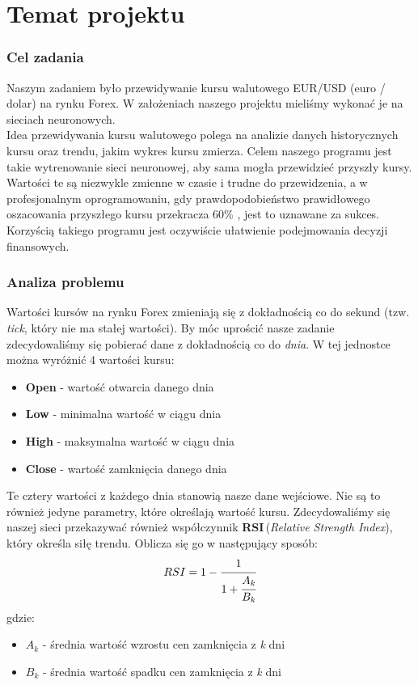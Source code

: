 \documentclass[a4paper]{article}
\begin{document}
	\part{Temat projektu}
		\section{Cel zadania}
		Naszym zadaniem było przewidywanie kursu walutowego EUR/USD (euro / dolar) na rynku Forex. W założeniach naszego projektu mieliśmy wykonać je na sieciach neuronowych.\\
		Idea przewidywania kursu walutowego polega na analizie danych historycznych kursu oraz trendu, jakim wykres kursu zmierza. Celem naszego programu jest takie wytrenowanie sieci neuronowej, aby sama mogła przewidzieć przyszły kursy. Wartości te są niezwykle zmienne w czasie i trudne do przewidzenia, a w profesjonalnym oprogramowaniu, gdy  prawdopodobieństwo prawidłowego oszacowania przyszłego kursu przekracza 60\% , jest to uznawane za sukces. Korzyścią takiego programu jest oczywiście ułatwienie podejmowania decyzji finansowych.
		\section{Analiza problemu}\label{sec:analiza}
			Wartości kursów na rynku Forex zmieniają się z dokładnością co do sekund (tzw. \emph{tick}, który nie ma stałej wartości). By móc uprościć nasze zadanie zdecydowaliśmy się pobierać dane z dokładnością co do \textit{dnia}. W tej jednostce można wyróżnić 4 wartości kursu:
			\begin{itemize}
				\item \textbf{Open} - wartość otwarcia danego dnia
				\item \textbf{Low} - minimalna wartość w ciągu dnia
				\item \textbf{High} - maksymalna wartość w ciągu dnia
				\item \textbf{Close} - wartość zamknięcia danego dnia
			\end{itemize}
			Te cztery wartości z każdego dnia stanowią nasze dane wejściowe. Nie są to również jedyne parametry, które określają wartość kursu. Zdecydowaliśmy się naszej sieci przekazywać również współczynnik \textbf{RSI}\,(\emph{Relative Strength Index}), który określa siłę trendu. Oblicza się go w następujący sposób:
			$$ RSI=1-\cfrac{1}{1+\cfrac{A_k}{B_k}}$$
			gdzie:
			\begin{itemize}
				\item $ A_k $ - średnia wartość wzrostu cen zamknięcia z \textit{k} dni
				\item $ B_k $ - średnia wartość spadku cen zamknięcia z \textit{k} dni
			\end{itemize}
\end{document}
